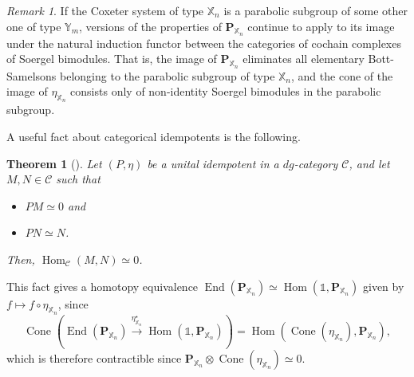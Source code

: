 \documentclass[11pt]{article}
\DeclareMathOperator{\Hom}{Hom}
\DeclareMathOperator{\Cone}{Cone}
\DeclareMathOperator{\End}{End}
\newtheorem{thm}{Theorem}[section]
\theoremstyle{definition}
\theoremstyle{remark}
\newtheorem*{remark}{Remark}
\numberwithin{equation}{section}
\begin{document}
\begin{remark}
	If the Coxeter system of type $\mathbb{X}_n$ is a parabolic subgroup of
	some other one of type $\mathbb{Y}_m$, versions of the properties of
	$\mathbf{P}_{\mathbb{X}_n}$ continue to apply to its image under the natural
	induction functor between the categories of cochain complexes
	of Soergel bimodules. That is, the image of $\mathbf{P}_{\mathbb{X}_n}$
	eliminates all elementary Bott-Samelsons belonging to the parabolic
	subgroup of type $\mathbb{X}_n$, and the cone of the image of
	$\eta_{\mathbb{X}_n}$ consists only of non-identity Soergel bimodules in the
	parabolic subgroup.
\end{remark}
\noindent A useful fact about categorical idempotents is the following.
\begin{thm}[\cite{hogancamp_constructing_2020, hogancamp_idempotents_2017}]
\label{thm:idempotentmorphismzero}
Let $(P,\eta)$ be a unital idempotent in a $dg$-category
$\mathcal{C}$, and let $M,N\in\mathcal{C}$ such that
\begin{itemize}
	\item $PM\simeq 0$ and 
	\item $PN\simeq N$.
\end{itemize}
\noindent Then, $\Hom_{\mathcal{C}}(M,N)\simeq 0$.
\end{thm}
\noindent This fact 
	gives a homotopy
	equivalence $\End(\mathbf{P}_{\mathbb{X}_n})\simeq \Hom(\mathbb{1},
	\mathbf{P}_{\mathbb{X}_n})$ given by $f\mapsto f\circ \eta_{\mathbb{X}_n}$, 
	since
	\[\Cone\left(\End(\mathbf{P}_{\mathbb{X}_n})
			\xrightarrow{\eta_{\mathbb{X}_n}^\star}
		\Hom(\mathbb{1},\mathbf{P}_{\mathbb{X}_n})\right)=
	\Hom(\Cone(\eta_{\mathbb{X}_n}), \mathbf{P}_{\mathbb{X}_n}),\]
	which is therefore contractible since $\mathbf{P}_{\mathbb{X}_n}
	\otimes \Cone(\eta_{\mathbb{X}_n})
\simeq 0$.
\end{document}
